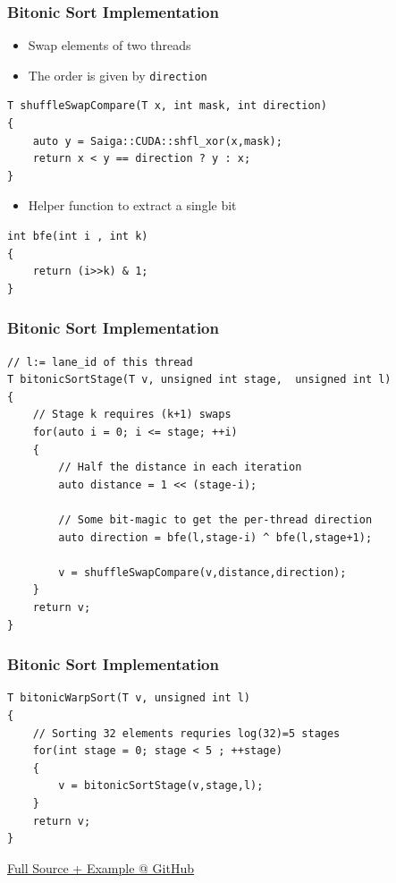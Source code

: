 \documentclass[aspectratio=169]{beamer}
\begin{document}
\begin{frame}[fragile]
\frametitle{Bitonic Sort Implementation}
\begin{itemize}
	\item Swap elements of two threads
	\item The order is given by \texttt{direction}
\end{itemize}
\begin{lstlisting}
T shuffleSwapCompare(T x, int mask, int direction)
{
	auto y = Saiga::CUDA::shfl_xor(x,mask);
	return x < y == direction ? y : x;
}
\end{lstlisting}
\begin{itemize}
	\item Helper function to extract a single bit
\end{itemize}
\begin{lstlisting}
int bfe(int i , int k)
{
	return (i>>k) & 1;
}
\end{lstlisting}
\end{frame}

\begin{frame}[fragile]
\frametitle{Bitonic Sort Implementation}
\begin{lstlisting}
// l:= lane_id of this thread
T bitonicSortStage(T v, unsigned int stage,  unsigned int l)
{
	// Stage k requires (k+1) swaps
	for(auto i = 0; i <= stage; ++i)
	{
		// Half the distance in each iteration
		auto distance = 1 << (stage-i);
		
		// Some bit-magic to get the per-thread direction
		auto direction = bfe(l,stage-i) ^ bfe(l,stage+1);
		
		v = shuffleSwapCompare(v,distance,direction);
	}
	return v;
}
\end{lstlisting}
\end{frame}


\begin{frame}[fragile]
\frametitle{Bitonic Sort Implementation}
\begin{lstlisting}
T bitonicWarpSort(T v, unsigned int l)
{
	// Sorting 32 elements requries log(32)=5 stages
	for(int stage = 0; stage < 5 ; ++stage)
	{
		v = bitonicSortStage(v,stage,l);
	}
	return v;
}
\end{lstlisting}
\href{https://github.com/darglein/saiga/blob/master/samples/cuda/bitonicSort/main.cu}{Full Source + Example @ GitHub}
\end{frame}
\end{document}
